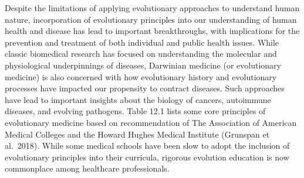 \documentclass[
]{book}
\begin{document}
Despite the limitations of applying evolutionary approaches to understand human nature, incorporation of evolutionary principles into our understanding of human health and disease has lead to important breakthroughs, with implications for the prevention and treatment of both individual and public health issues. While classic biomedical research has focused on understanding the molecular and physiological underpinnings of diseases, Darwinian medicine (or evolutionary medicine) is also concerned with how evolutionary history and evolutionary processes have impacted our propensity to contract diseases. Such approaches have lead to important insights about the biology of cancers, autoimmune diseases, and evolving pathogens. Table 12.1 lists some core principles of evolutionary medicine based on recommendation of The Association of American Medical Colleges and the Howard Hughes Medical Institute (Grunspan et al.~2018). While some medical schools have been slow to adopt the inclusion of evolutionary principles into their curricula, rigorous evolution education is now commonplace among healthcare professionals.
\end{document}
